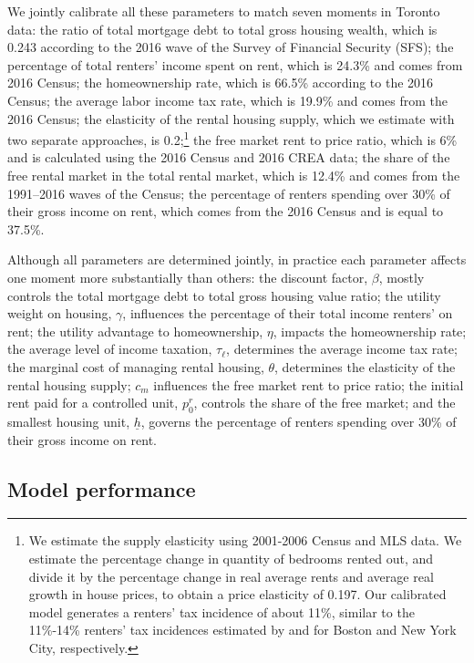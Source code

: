 \documentclass[parskip=full]{article}
\begin{document}
We jointly calibrate all these parameters to match seven moments in Toronto data: the ratio of total mortgage debt to total gross housing wealth, which is 0.243 according to the 2016 wave of the Survey of Financial Security (SFS); the percentage of total renters' income spent on rent, which is 24.3\% and comes from 2016 Census; the homeownership rate, which is 66.5\% according to the 2016 Census; the average labor income tax rate, which is 19.9\% and comes from the 2016 Census; the elasticity of the rental housing supply, which we estimate with two separate approaches, is 0.2;\footnote{We estimate the supply elasticity using 2001-2006 Census and MLS data. We estimate the percentage change in quantity of bedrooms rented out, and divide it by the percentage change in real average rents and average real growth in house prices, to obtain a price elasticity of 0.197. Our calibrated model generates a renters' tax incidence of about 11\%, similar to the 11\%-14\% renters' tax incidences estimated by \citet{cy-1994} and \citet{sy-2020} for Boston and New York City, respectively.} the free market rent to price ratio, which is 6\% and is calculated using the 2016 Census and 2016 CREA data; the share of the free rental market in the total rental market, which is 12.4\% and comes from the 1991--2016 waves of the Census; the percentage of renters spending over 30\% of their gross income on rent, which comes from the 2016 Census and is equal to 37.5\%.

Although all parameters are determined jointly, in practice each parameter affects one moment more substantially than others: the discount factor, $\beta$, mostly controls the total mortgage debt to total gross housing value ratio; the utility weight on housing, $\gamma$, influences the percentage of their total income renters' on rent; the utility advantage to homeownership, $\eta$, impacts the homeownership rate; the average level of income taxation, $\tau_{\ell}$, determines the average income tax rate; the marginal cost of managing rental housing, $\theta$, determines the elasticity of the rental housing supply; $c_{m}$ influences the free market rent to price ratio; the initial rent paid for a controlled unit, $p^{r}_{0}$, controls the share of the free market; and the smallest housing unit, $\underline{h}$, governs the percentage of renters spending over 30\% of their gross income on rent.

\subsection{Model performance}\label{subsection:non_targeted_statistics}
\end{document}
